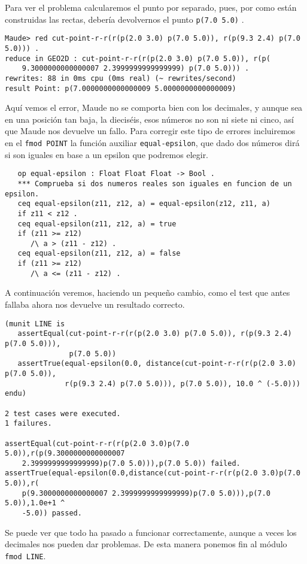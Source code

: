 Para ver el problema calcularemos el punto por separado, pues, por como están construidas las rectas, debería devolvernos el punto \texttt{p(7.0 5.0)} .\par
{\codesize
\begin{verbatim}
Maude> red cut-point-r-r(r(p(2.0 3.0) p(7.0 5.0)), r(p(9.3 2.4) p(7.0 5.0))) .
reduce in GEO2D : cut-point-r-r(r(p(2.0 3.0) p(7.0 5.0)), r(p(
    9.3000000000000007 2.3999999999999999) p(7.0 5.0))) .
rewrites: 88 in 0ms cpu (0ms real) (~ rewrites/second)
result Point: p(7.0000000000000009 5.0000000000000009)
\end{verbatim}
}
Aquí vemos el error, Maude no se comporta bien con los decimales, y aunque sea en una posición tan baja, la dieciséis, esos números no son ni siete ni cinco, así que Maude nos devuelve un fallo. Para corregir este tipo de errores incluiremos en el \verb"fmod POINT" la función auxiliar \texttt{equal-epsilon}, que dado dos números dirá si son iguales en base a un epsilon que podremos elegir.\par
{\codesize
\begin{verbatim}
   op equal-epsilon : Float Float Float -> Bool .
   *** Comprueba si dos numeros reales son iguales en funcion de un epsilon.
   ceq equal-epsilon(z11, z12, a) = equal-epsilon(z12, z11, a)
   if z11 < z12 .
   ceq equal-epsilon(z11, z12, a) = true
   if (z11 >= z12) 
      /\ a > (z11 - z12) .
   ceq equal-epsilon(z11, z12, a) = false
   if (z11 >= z12) 
      /\ a <= (z11 - z12) .
\end{verbatim}   
}

A continuación veremos, haciendo un pequeño cambio, como el test que antes fallaba ahora nos devuelve un resultado correcto.
{\codesize
\begin{verbatim}
(munit LINE is
   assertEqual(cut-point-r-r(r(p(2.0 3.0) p(7.0 5.0)), r(p(9.3 2.4) p(7.0 5.0))),
               p(7.0 5.0))
   assertTrue(equal-epsilon(0.0, distance(cut-point-r-r(r(p(2.0 3.0) p(7.0 5.0)),
              r(p(9.3 2.4) p(7.0 5.0))), p(7.0 5.0)), 10.0 ^ (-5.0)))
endu)

2 test cases were executed.
1 failures.

assertEqual(cut-point-r-r(r(p(2.0 3.0)p(7.0 5.0)),r(p(9.3000000000000007
    2.3999999999999999)p(7.0 5.0))),p(7.0 5.0)) failed.
assertTrue(equal-epsilon(0.0,distance(cut-point-r-r(r(p(2.0 3.0)p(7.0 5.0)),r(
    p(9.3000000000000007 2.3999999999999999)p(7.0 5.0))),p(7.0 5.0)),1.0e+1 ^
    -5.0)) passed.
\end{verbatim} 
}
Se puede ver que todo ha pasado a funcionar correctamente, aunque a veces los decimales nos pueden dar problemas. De esta manera ponemos fin al módulo \texttt{fmod LINE}. \par

